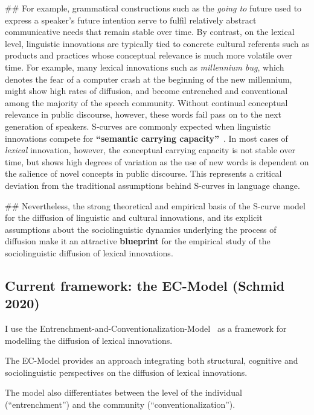 \documentclass[
  a4paper,
  abstract=on,
  captions=tableabove
  ]{scrartcl}
\renewcommand{\hw}[1]{\textbf{#1}}
\begin{document}
\begin{easylist}[itemize]
  ## For example, grammatical constructions such as the \emph{going to} future used to express a speaker's future intention serve to fulfil relatively abstract communicative needs that remain stable over time. By contrast, on the lexical level, linguistic innovations are typically tied to concrete cultural referents such as products and practices whose conceptual relevance is much more volatile over time. For example, many lexical innovations such as \emph{millennium bug}, which denotes the fear of a computer crash at the beginning of the new millennium, might show high rates of diffusion, and become entrenched and conventional among the majority of the speech community. Without continual conceptual relevance in public discourse, however, these words fail pass on to the next generation of speakers. S-curves are commonly expected when linguistic innovations compete for \hw{\enquote{semantic carrying capacity}}~\parencite{Nini2017ApplicationGrowth}. In most cases of \emph{lexical} innovation, however, the conceptual carrying capacity is not stable over time, but shows high degrees of variation as the use of new words is dependent on the salience of novel concepts in public discourse. This represents a critical deviation from the traditional assumptions behind S-curves in language change.

  ## Nevertheless, the strong theoretical and empirical basis of the S-curve model for the diffusion of linguistic and cultural innovations, and its explicit assumptions about the sociolinguistic dynamics underlying the process of diffusion make it an attractive \hw{blueprint} for the empirical study of the sociolinguistic diffusion of lexical innovations.

  \end{easylist}


  \subsection{Current framework: the EC-Model (Schmid 2020)}
    \label{subsec:ec-model}

  I use the Entrenchment-and-Conventionalization-Model~\parencite{Schmid2020DynamicsLinguistic} as a framework for modelling the diffusion of lexical innovations.

  The EC-Model provides an approach integrating both structural, cognitive and sociolinguistic perspectives on the diffusion of lexical innovations.

  The model also differentiates between the level of the individual (\enquote{entrenchment}) and the community (\enquote{conventionalization}).
\end{document}
